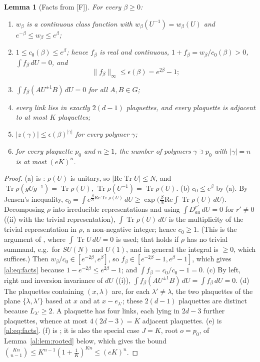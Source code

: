 \documentclass[11pt,a4paper]{article}
\newtheorem{lemma}[theorem]{Lemma}
\theoremstyle{definition}
\theoremstyle{remark}
\DeclareMathOperator{\Tr}{Tr}
\newcommand{\dU}{\,dU}
\newcommand{\norm}[1]{\lVert #1\rVert}
\newcommand{\Fref}[3]{\cite[#1~`#2' (\texttt{#3})]{F}}
\newcommand{\Flab}[2]{\cite[#1 \texttt{#2}]{F}}
\begin{document}
\begin{lemma}[Facts from {[F]}]\label{al:lem:facts}
For every $\beta\ge0$:
\begin{enumerate}[label=(\alph*)]
\item $w_\beta$ is a continuous class function with $w_\beta(U^{-1})=w_\beta(U)$ and $e^{-\beta}\le w_\beta\le e^\beta$;
\item $1\le c_0(\beta)\le e^\beta$; hence $f_\beta$ is real and continuous, $1+f_\beta=w_\beta/c_0(\beta)>0$,
$\int f_\beta\dU=0$, and
\begin{equation}\label{al:eq:facts}
\norm{f_\beta}_\infty\le\epsilon(\beta)=e^{2\beta}-1;
\end{equation}
\item $\int f_\beta(AU^{\pm1}B)\dU=0$ for all $A,B\in G$;
\item every link lies in exactly $2(d-1)$ plaquettes, and every plaquette is adjacent to at most $K$ plaquettes;
\item $|z(\gamma)|\le\epsilon(\beta)^{|\gamma|}$ for every polymer $\gamma$;
\item for every plaquette $p_0$ and $n\ge1$, the number of polymers $\gamma\ni p_0$ with $|\gamma|=n$ is at most $(eK)^n$.
\end{enumerate}
\end{lemma}

\begin{proof}
(a) is \Flab{eq.}{eq:w}: $\rho(U)$ is unitary, so $|\mathrm{Re}\Tr U|\le N$, and $\Tr\rho(gUg^{-1})=\Tr\rho(U)$,
$\Tr\rho(U^{-1})=\overline{\Tr\rho(U)}$. (b) $c_0\le e^\beta$ by (a). By Jensen's inequality,
$c_0=\int e^{\frac\beta N\mathrm{Re}\Tr\rho(U)}\dU\ge\exp\bigl(\frac\beta N\mathrm{Re}\int\Tr\rho(U)\dU\bigr)$. Decomposing
$\rho$ into irreducible representations and using $\int D^{r'}_{aa}\dU=0$ for $r'\neq0$ (\Fref{Cited Theorem}{Haar
measure, Peter--Weyl}{thm:pw}(ii) with the trivial representation), $\int\Tr\rho(U)\dU$ is the multiplicity of the
trivial representation in $\rho$, a non-negative integer; hence $c_0\ge1$. (This is the argument of
\Flab{Corollary}{cor:uniform}, where $\int\Tr U\dU=0$ is used; that holds if $\rho$ has no trivial summand, e.g.\ for
$SU(N)$ and $U(1)$, and in general the integral is $\ge0$, which suffices.) Then $w_\beta/c_0\in[e^{-2\beta},e^\beta]$,
so $f_\beta\in[e^{-2\beta}-1,e^\beta-1]$, which gives \eqref{al:eq:facts} because $1-e^{-2\beta}\le e^{2\beta}-1$; and
$\int f_\beta=c_0/c_0-1=0$. (c) By left, right and inversion invariance of $dU$ (\Flab{Cited Theorem}{thm:pw}(i)),
$\int f_\beta(AU^{\pm1}B)\dU=\int f_\beta\dU=0$. (d) The plaquettes containing $(x,\lambda)$ are, for each
$\lambda'\neq\lambda$, the two plaquettes of the plane $\{\lambda,\lambda'\}$ based at $x$ and at $x-e_{\lambda'}$; these
$2(d-1)$ plaquettes are distinct because $L_{\lambda'}\ge2$. A plaquette has four links, each lying in $2d-3$ further
plaquettes, whence at most $4(2d-3)=K$ adjacent plaquettes. (e) is \eqref{al:eq:facts}. (f) is
\Fref{Lemma}{Counting polymers}{lem:count}; it is also the special case $J=K$, root $o=p_0$, of
Lemma~\ref{al:lem:rooted} below, which gives the bound $\binom{Kn}{n-1}\le K^{n-1}(1+\frac1K)^{Kn}\le(eK)^n$.
\end{proof}
\end{document}
